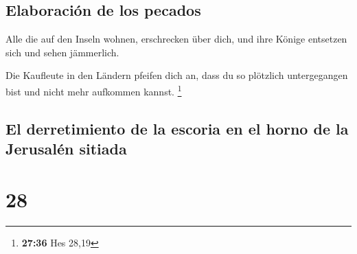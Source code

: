 \hypertarget{elaboraciuxf3n-de-los-pecados}{%
\subsection{Elaboración de los
pecados}\label{elaboraciuxf3n-de-los-pecados}}

 Alle die auf den Inseln wohnen, erschrecken über dich,
und ihre Könige entsetzen sich und sehen jämmerlich.

 Die Kaufleute in den Ländern pfeifen dich an, dass du so
plötzlich untergegangen bist und nicht mehr aufkommen kannst.
\footnote{\textbf{27:36} Hes 28,19}

\hypertarget{el-derretimiento-de-la-escoria-en-el-horno-de-la-jerusaluxe9n-sitiada}{%
\subsection{El derretimiento de la escoria en el horno de la Jerusalén
sitiada}\label{el-derretimiento-de-la-escoria-en-el-horno-de-la-jerusaluxe9n-sitiada}}

\hypertarget{section-27}{%
\section{28}\label{section-27}}

